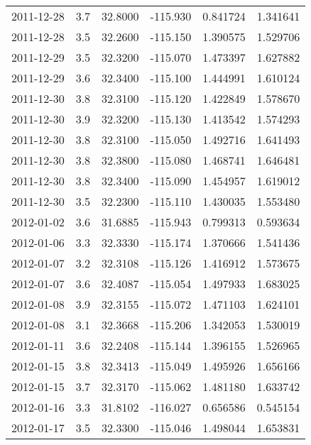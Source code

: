 \begin{tabular}{lrrrrr}
2011-12-28 &       3.7 &  32.8000 &  -115.930 &         0.841724 &         1.341641 \\
2011-12-28 &       3.5 &  32.2600 &  -115.150 &         1.390575 &         1.529706 \\
2011-12-29 &       3.5 &  32.3200 &  -115.070 &         1.473397 &         1.627882 \\
2011-12-29 &       3.6 &  32.3400 &  -115.100 &         1.444991 &         1.610124 \\
2011-12-30 &       3.8 &  32.3100 &  -115.120 &         1.422849 &         1.578670 \\
2011-12-30 &       3.9 &  32.3200 &  -115.130 &         1.413542 &         1.574293 \\
2011-12-30 &       3.8 &  32.3100 &  -115.050 &         1.492716 &         1.641493 \\
2011-12-30 &       3.8 &  32.3800 &  -115.080 &         1.468741 &         1.646481 \\
2011-12-30 &       3.8 &  32.3400 &  -115.090 &         1.454957 &         1.619012 \\
2011-12-30 &       3.5 &  32.2300 &  -115.110 &         1.430035 &         1.553480 \\
2012-01-02 &       3.6 &  31.6885 &  -115.943 &         0.799313 &         0.593634 \\
2012-01-06 &       3.3 &  32.3330 &  -115.174 &         1.370666 &         1.541436 \\
2012-01-07 &       3.2 &  32.3108 &  -115.126 &         1.416912 &         1.573675 \\
2012-01-07 &       3.6 &  32.4087 &  -115.054 &         1.497933 &         1.683025 \\
2012-01-08 &       3.9 &  32.3155 &  -115.072 &         1.471103 &         1.624101 \\
2012-01-08 &       3.1 &  32.3668 &  -115.206 &         1.342053 &         1.530019 \\
2012-01-11 &       3.6 &  32.2408 &  -115.144 &         1.396155 &         1.526965 \\
2012-01-15 &       3.8 &  32.3413 &  -115.049 &         1.495926 &         1.656166 \\
2012-01-15 &       3.7 &  32.3170 &  -115.062 &         1.481180 &         1.633742 \\
2012-01-16 &       3.3 &  31.8102 &  -116.027 &         0.656586 &         0.545154 \\
2012-01-17 &       3.5 &  32.3300 &  -115.046 &         1.498044 &         1.653831 \\

\end{tabular}
